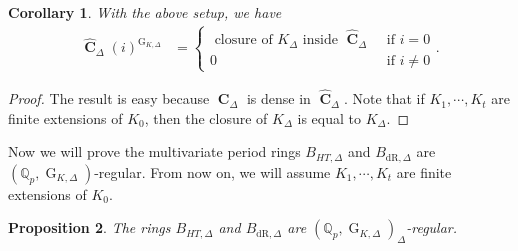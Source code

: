 \documentclass{amsart}
\newtheorem{proposition}{Proposition}[section]
\newtheorem{corollary}[proposition]{Corollary}
\DeclareMathOperator{\C}{\textbf{C}}
\newcommand{\mBdr}{B_{\mathrm{dR},\Delta}}
\newcommand{\mBHT}{B_{HT,\Delta}}
\DeclareMathOperator{\G}{G}
\begin{document}
\begin{corollary}\label{Corollary of Multivariate Tate-Sen Theorem}
    With the above setup, we have
    \begin{align*}
       \widehat{\C}_\Delta(i)^{\G_{K,\Delta}}&=
                   \begin{cases}
                     \text{ closure of $K_\Delta$ inside $\widehat{\C}_\Delta$} &\text{ if } i=0\\
                     0 &\text{ if } i\neq 0
                   \end{cases}.
    \end{align*}
\end{corollary}

\begin{proof}
    The result is easy because $\C_\Delta$ is dense in $\widehat{\C}_\Delta$. Note that if $K_1,\cdots,K_t$ are finite extensions of $K_0$, then the closure of $K_\Delta$ is equal to $K_\Delta$.
\end{proof}

Now we will prove the multivariate period rings $\mBHT$ and $\mBdr$ are $(\mathbb{Q}_p,\G_{K,\Delta})$-regular. From now on, we will assume $K_1,\cdots,K_t$ are finite extensions of $K_0$.

\begin{proposition}
    The rings $\mBHT$ and $\mBdr$ are $(\mathbb{Q}_p,\G_{K,\Delta})_\Delta$-regular.
\end{proposition}
\end{document}

